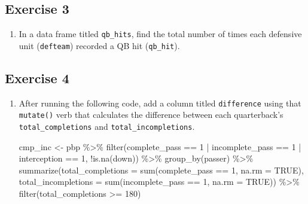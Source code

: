 \documentclass[
  letterpaper,
]{krantz}
\newenvironment{Shaded}{\begin{snugshade}}{\end{snugshade}}
\newcommand{\AttributeTok}[1]{\textcolor[rgb]{0.40,0.45,0.13}{#1}}
\newcommand{\ConstantTok}[1]{\textcolor[rgb]{0.56,0.35,0.01}{#1}}
\newcommand{\DecValTok}[1]{\textcolor[rgb]{0.68,0.00,0.00}{#1}}
\newcommand{\FunctionTok}[1]{\textcolor[rgb]{0.28,0.35,0.67}{#1}}
\newcommand{\NormalTok}[1]{\textcolor[rgb]{0.00,0.23,0.31}{#1}}
\newcommand{\OtherTok}[1]{\textcolor[rgb]{0.00,0.23,0.31}{#1}}
\newcommand{\SpecialCharTok}[1]{\textcolor[rgb]{0.37,0.37,0.37}{#1}}
\providecommand{\tightlist}{%
  \setlength{\itemsep}{0pt}\setlength{\parskip}{0pt}}\usepackage{longtable,booktabs,array}
\begin{document}
\hypertarget{exercise-3}{%
\subsection{\texorpdfstring{\textbf{Exercise
3}}{Exercise 3}}\label{exercise-3}}

\begin{enumerate}
\def\labelenumi{\arabic{enumi}.}
\tightlist
\item
  In a data frame titled \texttt{qb\_hits}, find the total number of
  times each defensive unit (\texttt{defteam}) recorded a QB hit
  (\texttt{qb\_hit}).
\end{enumerate}

\hypertarget{exercise-4}{%
\subsection{\texorpdfstring{\textbf{Exercise
4}}{Exercise 4}}\label{exercise-4}}

\begin{enumerate}
\def\labelenumi{\arabic{enumi}.}
\item
  After running the following code, add a column titled
  \texttt{difference} using that \texttt{mutate()} verb that calculates
  the difference between each quarterback's \texttt{total\_completions}
  and \texttt{total\_incompletions}.

\begin{Shaded}
\begin{Highlighting}[]
\NormalTok{cmp\_inc }\OtherTok{\textless{}{-}}\NormalTok{ pbp }\SpecialCharTok{\%\textgreater{}\%}
  \FunctionTok{filter}\NormalTok{(complete\_pass }\SpecialCharTok{==} \DecValTok{1} \SpecialCharTok{|}
\NormalTok{           incomplete\_pass }\SpecialCharTok{==} \DecValTok{1} \SpecialCharTok{|}
\NormalTok{           interception }\SpecialCharTok{==} \DecValTok{1}\NormalTok{, }\SpecialCharTok{!}\FunctionTok{is.na}\NormalTok{(down)) }\SpecialCharTok{\%\textgreater{}\%}
  \FunctionTok{group\_by}\NormalTok{(passer) }\SpecialCharTok{\%\textgreater{}\%}
  \FunctionTok{summarize}\NormalTok{(}\AttributeTok{total\_completions =} \FunctionTok{sum}\NormalTok{(complete\_pass }\SpecialCharTok{==} \DecValTok{1}\NormalTok{,}
                                    \AttributeTok{na.rm =} \ConstantTok{TRUE}\NormalTok{),}
            \AttributeTok{total\_incompletions =} \FunctionTok{sum}\NormalTok{(incomplete\_pass }\SpecialCharTok{==} \DecValTok{1}\NormalTok{,}
                                      \AttributeTok{na.rm =} \ConstantTok{TRUE}\NormalTok{)) }\SpecialCharTok{\%\textgreater{}\%}
  \FunctionTok{filter}\NormalTok{(total\_completions }\SpecialCharTok{\textgreater{}=} \DecValTok{180}\NormalTok{)}
\end{Highlighting}
\end{Shaded}
\end{enumerate}
\end{document}

